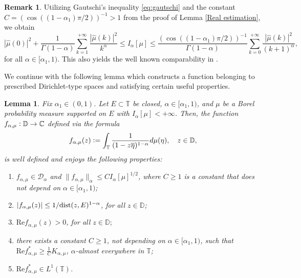 \documentclass[12pt]{amsart}
\newtheorem{lemma}[theorem]{Lemma}
\theoremstyle{definition}\newtheorem{remark}[theorem]{Remark}
\theoremstyle{definition}\newtheorem{example}[theorem]{Example}
\theoremstyle{definition}\newtheorem{definition}{Definition}
\numberwithin{equation}{section}
\newcommand\cD{{\mathcal D}}
\newcommand\CC{{\mathbb C}}
\newcommand\DD{{\mathbb D}}
\newcommand\TT{{\mathbb T}}
\begin{document}
\begin{remark}
Utilizing Gautschi's inequality \eqref{eq:gautschi} and the constant $C=(\cos((1-\alpha_1)\pi/2))^{-1}>1$ from the proof of Lemma \ref{Real estimation}, we obtain
\begin{equation*}
 |\hat{\mu}(0)|^2+\frac{1}{\Gamma(1-\alpha)}\sum_{k=1}^{+\infty}\frac{|\hat{\mu}(k)|^2}{k^\alpha}\leq I_\alpha[\mu]\leq \frac{(\cos((1-\alpha_1)\pi/2))^{-1}}{\Gamma(1-\alpha)}\sum_{k=0}^{+\infty}\frac{|\hat{\mu}(k)|^2}{(k+1)^\alpha},    
\end{equation*}
for all $\alpha\in [\alpha_1,1)$. This also yields the well known comparability in \cite[p. 566]{EFKR}.
\end{remark}

We continue with the following lemma which constructs a function belonging to prescribed Dirichlet-type spaces and satisfying certain useful properties.
\begin{lemma}\label{real}
Fix $\alpha_1\in (0,1)$. Let $E\subset \TT$ be closed, $\alpha\in[\alpha_1,1)$, and $\mu$ be a Borel probability measure supported on $E$ with $I_{\alpha}[\mu]<+\infty$. Then, the function $f_{\alpha,\mu}\vcentcolon\DD\to \CC$ defined via the formula
\begin{equation}\label{eq:main lemma 1}
f_{\alpha,\mu}(z)\vcentcolon=\int_{\TT}\frac{1}{(1-z\overline{\eta})^{1-\alpha}}d\mu(\eta), \quad z\in \DD,
\end{equation}
is well defined and enjoys the following properties:
\begin{enumerate}
    \item[\textup{$(\alpha)$}] $f_{\alpha,\mu}\in \cD_{\alpha}$ and $\|f_{\alpha,\mu}\|_{\alpha}\leq C I_{\alpha}[\mu]^{1/2}$, where $C\ge1$ is a constant that does not depend on $\alpha\in [\alpha_1,1)$;
    \item[\textup{$(\beta)$}] $|f_{\alpha,\mu}(z)|\leq 1/\textup{dist}(z,E)^{1-\alpha}$, for all $z\in \DD$;
    \item[\textup{$(\gamma)$}] $\textrm{Re}f_{\alpha,\mu}(z)> 0$, for all $z\in \DD;$
    \item[\textup{$(\delta)$}] there exists a constant $C\ge1$, not depending on $\alpha\in[\alpha_1,1)$, such that $\textrm{Re}f^{*}_{\alpha,\mu}\geq \frac{1}{C}K_{\alpha,\mu}$, $\alpha$-almost everywhere in $\TT$;
    \item[\textup{$(\epsilon)$}] $\textrm{Re}f^{*}_{\alpha,\mu}\in L^1(\TT)$.
\end{enumerate}
\end{lemma}
\end{document}
